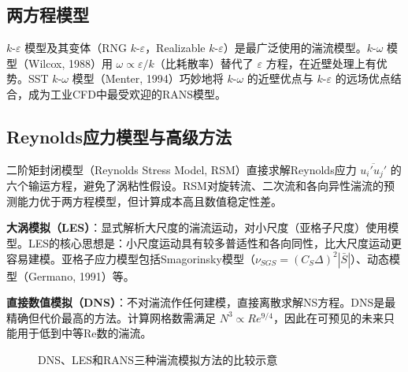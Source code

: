 \subsection{两方程模型}

$k$-$\varepsilon$ 模型及其变体（RNG $k$-$\varepsilon$，Realizable $k$-$\varepsilon$）是最广泛使用的湍流模型。$k$-$\omega$ 模型（Wilcox, 1988）用 $\omega \propto \varepsilon/k$（比耗散率）替代了 $\varepsilon$ 方程，在近壁处理上有优势。SST $k$-$\omega$ 模型（Menter, 1994）巧妙地将 $k$-$\omega$ 的近壁优点与 $k$-$\varepsilon$ 的远场优点结合，成为工业CFD中最受欢迎的RANS模型。

\subsection{Reynolds应力模型与高级方法}

二阶矩封闭模型（Reynolds Stress Model, RSM）直接求解Reynolds应力 $\overline{u_i'u_j'}$ 的六个输运方程，避免了涡粘性假设。RSM对旋转流、二次流和各向异性湍流的预测能力优于两方程模型，但计算成本高且数值稳定性差。

\textbf{大涡模拟（LES）}：显式解析大尺度的湍流运动，对小尺度（亚格子尺度）使用模型。LES的核心思想是：小尺度运动具有较多普适性和各向同性，比大尺度运动更容易建模。亚格子应力模型包括Smagorinsky模型（$\nu_{SGS} = (C_S\Delta)^{2}|\bar{S}|$）、动态模型（Germano, 1991）等。

\textbf{直接数值模拟（DNS）}：不对湍流作任何建模，直接离散求解NS方程。DNS是最精确但代价最高的方法。计算网格数需满足 $N^{3} \propto Re^{9/4}$，因此在可预见的未来只能用于低到中等Re数的湍流。

\begin{figure}[H]
\centering
{}
\caption{DNS、LES和RANS三种湍流模拟方法的比较示意}
\label{fig:turbulence-methods}
\end{figure}

